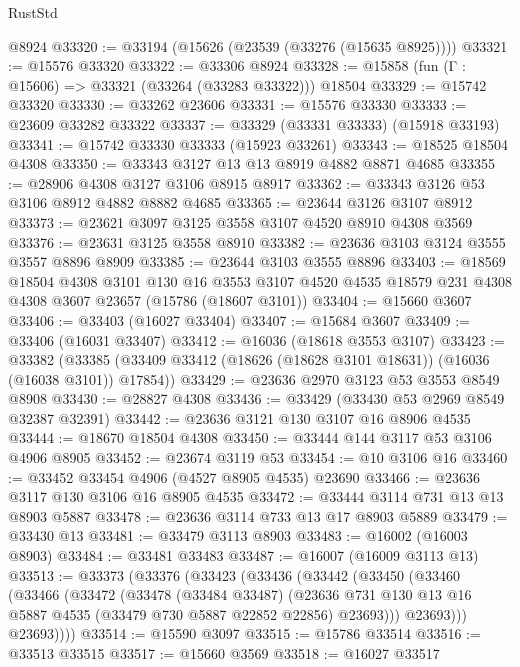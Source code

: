 \begin{lexlean}{RustStd}
\begin{coremodule}
    @8924
@33320 := @33194 (@15626 (@23539 (@33276 (@15635 @8925))))
@33321 := @15576 @33320
@33322 := @33306 @8924
@33328 := @15858 (fun (Γ : @15606) => @33321 (@33264 (@33283 @33322))) @18504
@33329 := @15742 @33320
@33330 := @33262 @23606
@33331 := @15576 @33330
@33333 := @23609 @33282 @33322
@33337 := @33329 (@33331 @33333) (@15918 @33193)
@33341 := @15742 @33330 @33333 (@15923 @33261)
@33343 := @18525 @18504 @4308
@33350 := @33343 @3127 @13 @13 @8919 @4882 @8871 @4685
@33355 := @28906 @4308 @3127 @3106 @8915 @8917
@33362 := @33343 @3126 @53 @3106 @8912 @4882 @8882 @4685
@33365 := @23644 @3126 @3107 @8912
@33373 := @23621 @3097 @3125 @3558 @3107 @4520 @8910 @4308 @3569
@33376 := @23631 @3125 @3558 @8910
@33382 := @23636 @3103 @3124 @3555 @3557 @8896 @8909
@33385 := @23644 @3103 @3555 @8896
@33403 := @18569
    @18504
    @4308
    @3101
    @130
    @16
    @3553
    @3107
    @4520
    @4535
    @18579
    @231
    @4308
    @4308
    @3607
    @23657
    (@15786 (@18607 @3101))
@33404 := @15660 @3607
@33406 := @33403 (@16027 @33404)
@33407 := @15684 @3607
@33409 := @33406 (@16031 @33407)
@33412 := @16036 (@18618 @3553 @3107)
@33423 := @33382
    (@33385 (@33409 @33412 (@18626 (@18628 @3101 @18631)) (@16036 (@16038 @3101)) @17854))
@33429 := @23636 @2970 @3123 @53 @3553 @8549 @8908
@33430 := @28827 @4308
@33436 := @33429 (@33430 @53 @2969 @8549 @32387 @32391)
@33442 := @23636 @3121 @130 @3107 @16 @8906 @4535
@33444 := @18670 @18504 @4308
@33450 := @33444 @144 @3117 @53 @3106 @4906 @8905
@33452 := @23674 @3119 @53
@33454 := @10 @3106 @16
@33460 := @33452 @33454 @4906 (@4527 @8905 @4535) @23690
@33466 := @23636 @3117 @130 @3106 @16 @8905 @4535
@33472 := @33444 @3114 @731 @13 @13 @8903 @5887
@33478 := @23636 @3114 @733 @13 @17 @8903 @5889
@33479 := @33430 @13
@33481 := @33479 @3113 @8903
@33483 := @16002 (@16003 @8903)
@33484 := @33481 @33483
@33487 := @16007 (@16009 @3113 @13)
@33513 := @33373
    (@33376
      (@33423
        (@33436
          (@33442
            (@33450
              (@33460
                (@33466
                  (@33472
                    (@33478
                      (@33484 @33487)
                      (@23636
                        @731
                        @130
                        @13
                        @16
                        @5887
                        @4535
                        (@33479 @730 @5887 @22852 @22856)
                        @23693)))
                  @23693)))
            @23693))))
@33514 := @15590 @3097
@33515 := @15786 @33514
@33516 := @33513 @33515
@33517 := @15660 @3569
@33518 := @16027 @33517

\end{coremodule}
\end{lexlean}
